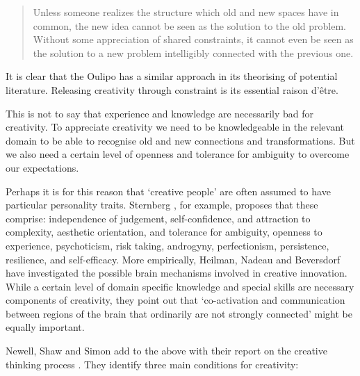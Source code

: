 \begin{quotation}
  Unless someone realizes the structure which old and new spaces have in common, the new idea cannot be seen as the solution to the old problem. Without some appreciation of shared constraints, it cannot even be seen as the solution to a new problem intelligibly connected with the previous one. 
\end{quotation}

\begin{leftbar}
It is clear that the Oulipo has a similar approach in its theorising of potential literature. Releasing creativity through constraint is its essential raison d'être.
\end{leftbar}

\begin{leftbar}
This is not to say that experience and knowledge are necessarily bad for creativity. To appreciate creativity we need to be knowledgeable in the relevant domain to be able to recognise old and new connections and transformations. But we also need a certain level of openness and tolerance for ambiguity to overcome our expectations.
\end{leftbar}

\begin{leftbar}
Perhaps it is for this reason that `creative people' are often assumed to have particular personality traits. Sternberg \autocite{Sternberg1999, Sternberg1999}, for example, proposes that these comprise: independence of judgement, self-confidence, and attraction to complexity, aesthetic orientation, and tolerance for ambiguity, openness to experience, psychoticism, risk taking, androgyny, perfectionism, persistence, resilience, and self-efficacy. More empirically, Heilman, Nadeau and Beversdorf \autocite{Heilman2003} have investigated the possible brain mechanisms involved in creative innovation. While a certain level of domain specific knowledge and special skills are necessary components of creativity, they point out that `co-activation and communication between regions of the brain that ordinarily are not strongly connected' might be equally important.
\end{leftbar}

\begin{leftbar}
Newell, Shaw and Simon add to the above with their report on the creative thinking process \autocite{Newell1963}. They identify three main conditions for creativity:
\end{leftbar}

